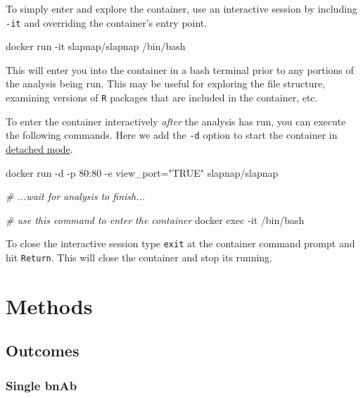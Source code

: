\documentclass[]{article}
\newenvironment{Shaded}{\begin{snugshade}}{\end{snugshade}}
\newcommand{\StringTok}[1]{\textcolor[rgb]{0.31,0.60,0.02}{#1}}
\newcommand{\CommentTok}[1]{\textcolor[rgb]{0.56,0.35,0.01}{\textit{#1}}}
\newcommand{\ExtensionTok}[1]{#1}
\newcommand{\NormalTok}[1]{#1}
\begin{document}
To simply enter and explore the container, use an interactive session by
including \texttt{-it} and overriding the container's entry point.

\begin{Shaded}
\begin{Highlighting}[]
\ExtensionTok{docker}\NormalTok{ run -it slapnap/slapnap /bin/bash}
\end{Highlighting}
\end{Shaded}

This will enter you into the container in a bash terminal prior to any
portions of the analysis being run. This may be useful for exploring the
file structure, examining versions of \texttt{R} packages that are
included in the container, etc.

To enter the container interactively \emph{after} the analysis has run,
you can execute the following commands. Here we add the \texttt{-d}
option to start the container in
\href{https://docs.docker.com/engine/reference/run/\#detached--d}{detached
mode}.

\begin{Shaded}
\begin{Highlighting}[]
\ExtensionTok{docker}\NormalTok{ run -d -p 80:80 -e view_port=}\StringTok{"TRUE"}\NormalTok{ slapnap/slapnap}

\CommentTok{# ...wait for analysis to finish...}

\CommentTok{# use this command to enter the container}
\ExtensionTok{docker}\NormalTok{ exec -it /bin/bash}
\end{Highlighting}
\end{Shaded}

To close the interactive session type \texttt{exit} at the container
command prompt and hit \texttt{Return}. This will close the container
and stop its running.

\section{Methods}\label{sec:methods}

\subsection{Outcomes}\label{sec:outcomedefs}

\subsubsection{Single bnAb}\label{single-bnab}
\end{document}
